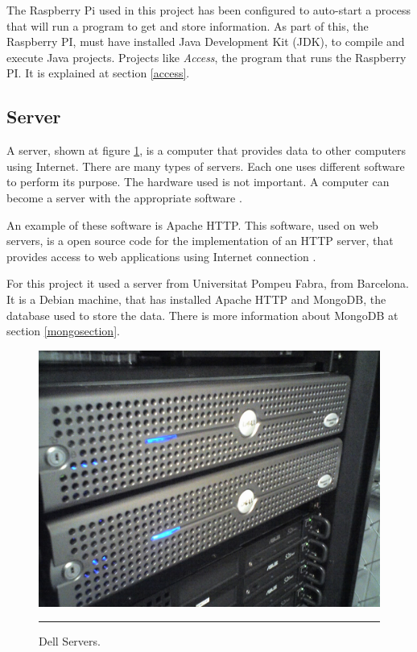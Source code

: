 \documentclass[12pt, a4paper,twoside]{tesi_upf}
\begin{document}
        
        The Raspberry Pi used in this project has been configured to auto-start a process that will run a program to get and store information. As part of this, the Raspberry PI, must have installed Java Development Kit (JDK), to compile and execute Java projects. Projects like \textit{Access}, the program that runs the Raspberry PI. It is explained at section \ref{access}.
        
        
        \subsection{Server}
        A server, shown at figure \ref{fig:server}, is a computer that provides data to other computers using Internet. There are many types of servers. Each one uses different software to perform its purpose. The hardware used is not important. A computer can become a server with the appropriate software \cite{server}. 
        
        An example of these software is Apache HTTP. This software, used on web servers, is a open source code for the implementation of an HTTP server, that provides access to web applications using Internet connection \cite{apache}. 
        
        For this project it used a server from Universitat Pompeu Fabra, from Barcelona. It is a Debian machine, that has installed Apache HTTP and MongoDB, the database used to store the data. There is more information about MongoDB at section \ref{mongosection}.

        \begin{figure}[htbp]
          \centering
              \includegraphics[scale=0.2]{./figures/Server.jpg}
              \rule{32em}{0.5pt}
          \caption[Server]{Dell Servers.}
          \label{fig:server}
        \end{figure}
        
\end{document}
